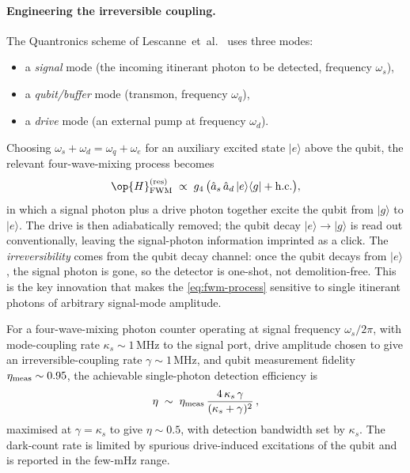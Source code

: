 \paragraph{Engineering the irreversible coupling.}
The Quantronics scheme of Lescanne~et~al.~\cite{lescanne2020} uses
three modes:
\begin{itemize}
  \item a \emph{signal} mode (the incoming itinerant photon to
        be detected, frequency $\omega_s$),
  \item a \emph{qubit/buffer} mode (transmon, frequency $\omega_q$),
  \item a \emph{drive} mode (an external pump at frequency
        $\omega_d$).
\end{itemize}
Choosing $\omega_s + \omega_d = \omega_q + \omega_e$ for an
auxiliary excited state $|e\rangle$ above the qubit, the
relevant four-wave-mixing process becomes
\begin{equation}
\label{eq:fwm-process}
\op{H}_{\rm FWM}^{(\rm res)}
\;\propto\; g_4\,\bigl(\hat a_s\,\hat a_d\,|e\rangle\langle g| + \hbox{h.c.}\bigr),
\end{equation}
in which a signal photon plus a drive photon together excite the
qubit from $|g\rangle$ to $|e\rangle$. The drive is then
adiabatically removed; the qubit decay $|e\rangle\to|g\rangle$ is
read out conventionally, leaving the signal-photon information
imprinted as a click. The \emph{irreversibility} comes from the
qubit decay channel: once the qubit decays from $|e\rangle$, the
signal photon is gone, so the detector is one-shot, not
demolition-free. This is the key innovation that makes the
\cref{eq:fwm-process} sensitive to single itinerant photons of
arbitrary signal-mode amplitude.

\begin{statement}
\label{stmt:fwm-efficiency}
For a four-wave-mixing photon counter operating at signal
frequency $\omega_s/2\pi$, with mode-coupling rate
$\kappa_s\sim 1\,\text{MHz}$ to the signal port, drive amplitude
chosen to give an irreversible-coupling rate
$\gamma\sim 1\,\text{MHz}$, and qubit measurement fidelity
$\eta_{\rm meas}\sim 0.95$, the achievable single-photon
detection efficiency is~\cite{lescanne2020}
\begin{equation}
\label{eq:fwm-efficiency}
\eta \;\sim\; \eta_{\rm meas}\,\frac{4\,\kappa_s\,\gamma}{(\kappa_s+\gamma)^2}\,,
\end{equation}
maximised at $\gamma=\kappa_s$ to give $\eta\sim 0.5$, with
detection bandwidth set by $\kappa_s$. The dark-count rate is
limited by spurious drive-induced excitations of the qubit and
is reported in the few-mHz range.
\end{statement}

